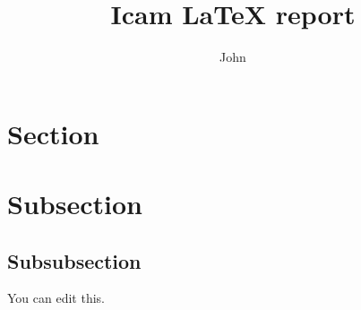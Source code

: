 \documentclass{utc-report/utc-report}
\title{Icam LaTeX report}
\author{John \sc{DOE}}
\begin{document}
\maketitlepage

\tableofcontents{}

\pagebreak

\section{Section}
\section{Subsection}
\subsection{Subsubsection}

You can edit this.

\end{document}
